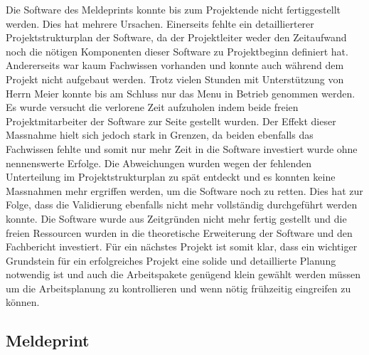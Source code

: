 Die Software des Meldeprints konnte bis zum Projektende nicht fertiggestellt werden. Dies hat mehrere Ursachen. Einerseits fehlte ein detaillierterer Projektstrukturplan der Software, da der Projektleiter weder den Zeitaufwand noch die nötigen Komponenten dieser Software zu Projektbeginn definiert hat. Andererseits war kaum Fachwissen vorhanden und konnte auch während dem Projekt nicht aufgebaut werden. Trotz vielen Stunden mit Unterstützung von Herrn Meier konnte bis am Schluss nur das Menu in Betrieb genommen werden. \newline
Es wurde versucht die verlorene Zeit aufzuholen indem beide freien Projektmitarbeiter der Software zur Seite gestellt wurden. Der Effekt dieser Massnahme hielt sich jedoch stark in Grenzen, da beiden ebenfalls das Fachwissen fehlte und somit nur mehr Zeit in die Software investiert wurde ohne nennenswerte Erfolge. \newline
Die Abweichungen wurden wegen der fehlenden Unterteilung im Projektstrukturplan zu spät entdeckt und es konnten keine Massnahmen mehr ergriffen werden, um die Software noch zu retten. Dies hat zur Folge, dass die Validierung ebenfalls nicht mehr vollständig durchgeführt werden konnte.  Die Software wurde aus Zeitgründen nicht mehr fertig gestellt und die freien Ressourcen wurden in die theoretische Erweiterung der Software und den Fachbericht investiert.\newline
Für ein nächstes Projekt ist somit klar, dass ein wichtiger Grundstein für ein erfolgreiches Projekt eine solide und detaillierte Planung notwendig ist und auch die Arbeitspakete genügend klein gewählt werden müssen um die Arbeitsplanung zu kontrollieren und wenn nötig frühzeitig eingreifen zu können.
\newpage 
\subsection{Meldeprint}

